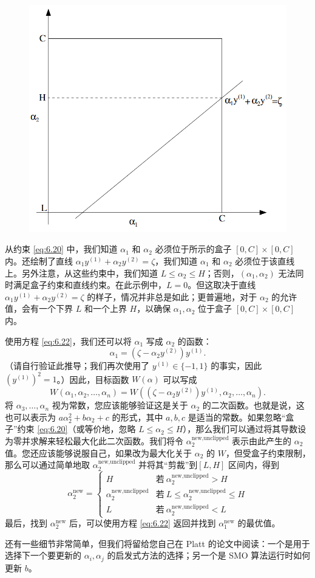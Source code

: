 \begin{figure}[H]
    \centering
    \includegraphics[width=0.5\linewidth]{figs/svm_smo_constraint.png}
\end{figure}

从约束 \eqref{eq:6.20} 中，我们知道 $\alpha_1$ 和 $\alpha_2$ 必须位于所示的盒子 $[0, C] \times [0, C]$ 内。还绘制了直线 $\alpha_1 y^{(1)} + \alpha_2 y^{(2)} = \zeta$，我们知道 $\alpha_1$ 和 $\alpha_2$ 必须位于该直线上。另外注意，从这些约束中，我们知道 $L \le \alpha_2 \le H$；否则，$(\alpha_1, \alpha_2)$ 无法同时满足盒子约束和直线约束。在此示例中，$L=0$。但这取决于直线 $\alpha_1 y^{(1)} + \alpha_2 y^{(2)} = \zeta$ 的样子，情况并非总是如此；更普遍地，对于 $\alpha_2$ 的允许值，会有一个下界 $L$ 和一个上界 $H$，以确保 $\alpha_1, \alpha_2$ 位于盒子 $[0, C] \times [0, C]$ 内。

使用方程 \eqref{eq:6.22}，我们还可以将 $\alpha_1$ 写成 $\alpha_2$ 的函数：
\[
    \alpha_1 = (\zeta - \alpha_2 y^{(2)}) y^{(1)}.
\]
（请自行验证此推导；我们再次使用了 $y^{(1)} \in \{-1, 1\}$ 的事实，因此 $(y^{(1)})^2 = 1$。）因此，目标函数 $W(\alpha)$ 可以写成
\[
    W(\alpha_1, \alpha_2, \dots, \alpha_n) = W((\zeta - \alpha_2 y^{(2)}) y^{(1)}, \alpha_2, \dots, \alpha_n).
\]
将 $\alpha_3, \dots, \alpha_n$ 视为常数，您应该能够验证这是关于 $\alpha_2$ 的二次函数。也就是说，这也可以表示为 $a\alpha_2^2 + b\alpha_2 + c$ 的形式，其中 $a, b, c$ 是适当的常数。如果忽略“盒子”约束 \eqref{eq:6.20}（或等价地，忽略 $L \le \alpha_2 \le H$），那么我们可以通过将其导数设为零并求解来轻松最大化此二次函数。我们将令 $\alpha_2^{\text{new,unclipped}}$ 表示由此产生的 $\alpha_2$ 值。您还应该能够说服自己，如果改为最大化关于 $\alpha_2$ 的 $W$，但受盒子约束限制，那么可以通过简单地取 $\alpha_2^{\text{new,unclipped}}$ 并将其“剪裁”到$[L, H]$ 区间内，得到
\[
    \alpha_2^{\text{new}} = \begin{cases}
        H & \text{若}\  \alpha_2^{\text{new,unclipped}} > H \\
        \alpha_2^{\text{new,unclipped}} & \text{若}\  L \le \alpha_2^{\text{new,unclipped}} \le H \\
        L & \text{若}\  \alpha_2^{\text{new,unclipped}} < L
    \end{cases}
\]
最后，找到 $\alpha_2^{\text{new}}$ 后，可以使用方程 \eqref{eq:6.22} 返回并找到 $\alpha_1^{\text{new}}$ 的最优值。

还有一些细节非常简单，但我们将留给您自己在 Platt 的论文中阅读：一个是用于选择下一个要更新的 $\alpha_i, \alpha_j$ 的启发式方法的选择；另一个是 SMO 算法运行时如何更新 $b$。